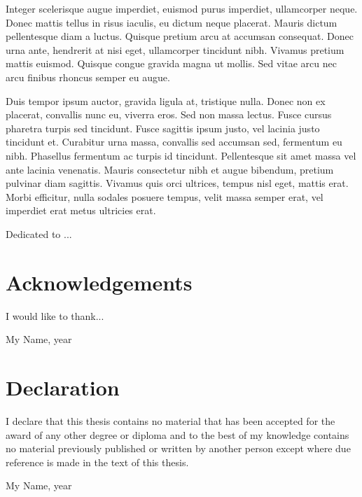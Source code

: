 Integer scelerisque augue imperdiet, euismod purus imperdiet, ullamcorper neque. Donec mattis tellus in risus iaculis, eu dictum neque placerat. Mauris dictum pellentesque diam a luctus. Quisque pretium arcu at accumsan consequat. Donec urna ante, hendrerit at nisi eget, ullamcorper tincidunt nibh. Vivamus pretium mattis euismod. Quisque congue gravida magna ut mollis. Sed vitae arcu nec arcu finibus rhoncus semper eu augue.

Duis tempor ipsum auctor, gravida ligula at, tristique nulla. Donec non ex placerat, convallis nunc eu, viverra eros. Sed non massa lectus. Fusce cursus pharetra turpis sed tincidunt. Fusce sagittis ipsum justo, vel lacinia justo tincidunt et. Curabitur urna massa, convallis sed accumsan sed, fermentum eu nibh. Phasellus fermentum ac turpis id tincidunt. Pellentesque sit amet massa vel ante lacinia venenatis. Mauris consectetur nibh et augue bibendum, pretium pulvinar diam sagittis. Vivamus quis orci ultrices, tempus nisl eget, mattis erat. Morbi efficitur, nulla sodales posuere tempus, velit massa semper erat, vel imperdiet erat metus ultricies erat.

\cleardoublepage

\newpage \vspace*{8cm}
\begin{center}
	\large Dedicated to ...
\end{center}


\cleardoublepage

\chapter*{Acknowledgements}
\vspace{-0.5cm}
I would like to thank...

\vspace*{2cm}
My Name, year

\cleardoublepage
\chapter*{Declaration}
I declare that this thesis contains no material that has been accepted for the award of any other degree or diploma and to the best of my knowledge contains no material previously published or written by another person except where due reference is made in the text of this thesis.

\vspace*{4cm} My Name, year

